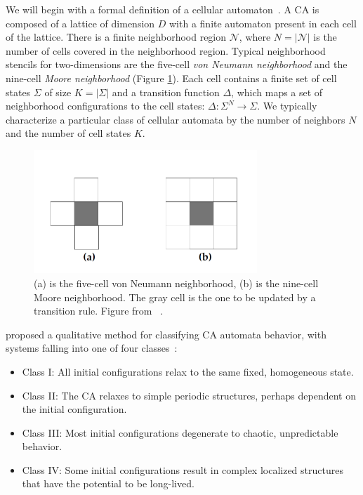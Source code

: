 \documentclass[a4paper,11pt,twoside]{report}
\begin{document}
\medskip

We will begin with a formal definition of a cellular automaton~\cite{la90}. A CA is composed of a lattice of dimension $D$ with a finite automaton present in each cell of the lattice. There is a finite neighborhood region $\mathcal{N}$, where $N = |\mathcal{N}|$ is the number of cells covered in the neighborhood region. Typical neighborhood stencils for two-dimensions are the five-cell \textit{von Neumann neighborhood} and the nine-cell \textit{Moore neighborhood} (Figure \ref{fig:neighborhoods}). Each cell contains a finite set of cell states $\Sigma$ of size $K = |\Sigma|$ and a transition function $\Delta$, which maps a set of neighborhood configurations to the cell states: $\Delta: \Sigma^N \to \Sigma$. We typically characterize a particular class of cellular automata by the number of neighbors $N$ and the number of cell states $K$. 

\begin{figure}[thp]
\centering
\includegraphics[width=0.75\textwidth]{mi96_fig3_neighborhoods}
\caption[CA Neighborhood Stencils]{
	(a) is the five-cell von Neumann neighborhood, (b) is the nine-cell Moore neighborhood. The gray cell is the one to be updated by a transition rule. Figure from \citeauthor{mi96}~\cite{mi96}.
}
\label{fig:neighborhoods}
\end{figure}

\medskip

\citeauthor{wf84} proposed a qualitative method for classifying CA automata behavior, with systems falling into one of four classes~\cite{mi96,wf84}:
\begin{itemize}[noitemsep, nolistsep]
\item Class I: All initial configurations relax to the same fixed, homogeneous state.
\item Class II: The CA relaxes to simple periodic structures, perhaps dependent on the initial configuration.
\item Class III: Most initial configurations degenerate to chaotic, unpredictable behavior.
\item Class IV: Some initial configurations result in complex localized structures that have the potential to be long-lived.
\end{itemize}
\end{document}
